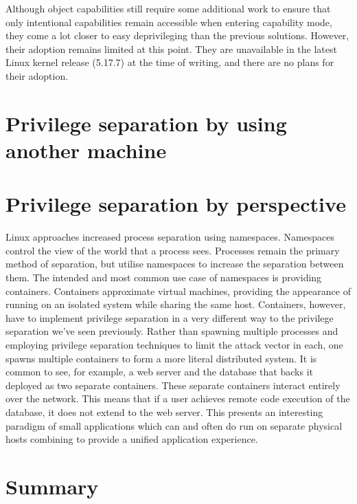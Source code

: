 \documentclass[12pt,a4paper,twoside]{report}
\begin{document}
Although object capabilities still require some additional work to ensure that only intentional capabilities remain accessible when entering capability mode, they come a lot closer to easy deprivileging than the previous solutions. However, their adoption remains limited at this point. They are unavailable in the latest Linux kernel release (5.17.7) at the time of writing, and there are no plans for their adoption.

\section{Privilege separation by using another machine}
\label{sec:priv-sep-another-machine}


\section{Privilege separation by perspective}
\label{sec:priv-sep-perspective}

Linux approaches increased process separation using namespaces. Namespaces control the view of the world that a process sees. Processes remain the primary method of separation, but utilise namespaces to increase the separation between them. The intended and most common use case of namespaces is providing containers. Containers approximate virtual machines, providing the appearance of running on an isolated system while sharing the same host. Containers, however, have to implement privilege separation in a very different way to the privilege separation we've seen previously. Rather than spawning multiple processes and employing privilege separation techniques to limit the attack vector in each, one spawns multiple containers to form a more literal distributed system. It is common to see, for example, a web server and the database that backs it deployed as two separate containers. These separate containers interact entirely over the network. This means that if a user achieves remote code execution of the database, it does not extend to the web server. This presents an interesting paradigm of small applications which can and often do run on separate physical hosts combining to provide a unified application experience.

\section{Summary}
\end{document}
